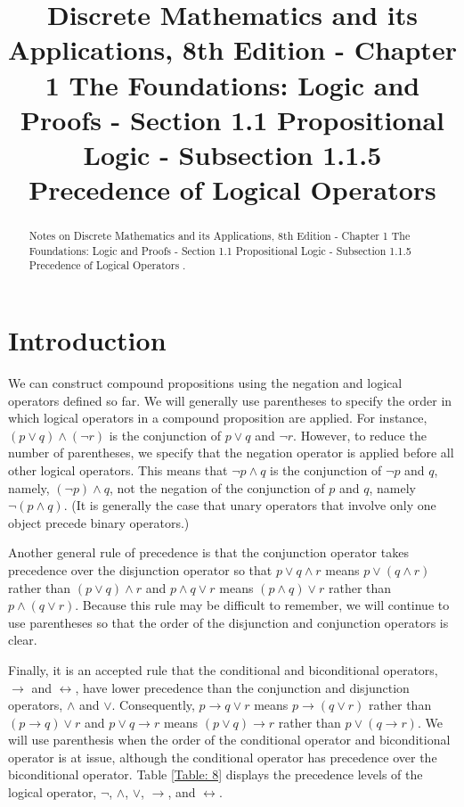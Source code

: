 \documentclass{Axon}
\title{Discrete Mathematics and its Applications, 8th Edition - Chapter 1 The Foundations: Logic and Proofs - Section 1.1 Propositional Logic - Subsection 1.1.5 Precedence of Logical Operators}
\begin{document}
\maketitle
\makeauthor
\begin{abstract}
Notes on Discrete Mathematics and its Applications, 8th Edition - Chapter 1 The Foundations: Logic and Proofs - Section 1.1 Propositional Logic - Subsection 1.1.5 Precedence of Logical Operators \cite{Rosen}.
\end{abstract}
\section{Introduction}
We can construct compound propositions using the negation and logical operators defined so far. We will generally use parentheses to specify the order in which logical operators in a compound proposition are applied. For instance, \((p \lor q) \land (\lnot r)\) is the conjunction of \(p \lor q\) and \(\lnot r\). However, to reduce the number of parentheses, we specify that the negation operator is applied before all other logical operators. This means that \(\lnot p \land q\) is the conjunction of \(\lnot p\) and \(q\), namely, \((\lnot p) \land q\), not the negation of the conjunction of \(p\) and \(q\), namely \(\lnot (p \land q)\). (It is generally the case that unary operators that involve only one object precede binary operators.)

Another general rule of precedence is that the conjunction operator takes precedence over the disjunction operator so that \(p \lor q \land r\) means \(p \lor (q \land r)\) rather than \((p \lor q) \land r\) and \(p \land q \lor r\) means \((p \land q) \lor r\) rather than \(p \land (q \lor r)\). Because this rule may be difficult to remember, we will continue to use parentheses so that the order of the disjunction and conjunction operators is clear.

Finally, it is an accepted rule that the conditional and biconditional operators, \(\to\) and \(\leftrightarrow\), have lower precedence than the conjunction and disjunction operators, \(\land\) and \(\lor\). Consequently, \(p \to q \lor r\) means \(p \to (q \lor r)\) rather than \((p \to q) \lor r\) and \(p \lor q \to r\) means \((p \lor q) \to r\) rather than \(p \lor (q \to r)\). We will use parenthesis when the order of the conditional operator and biconditional operator is at issue, although the conditional operator has precedence over the biconditional operator. Table \ref{Table: 8} displays the precedence levels of the logical operator, \(\lnot\), \(\land\), \(\lor\), \(\to\), and \(\leftrightarrow\).
\end{document}
